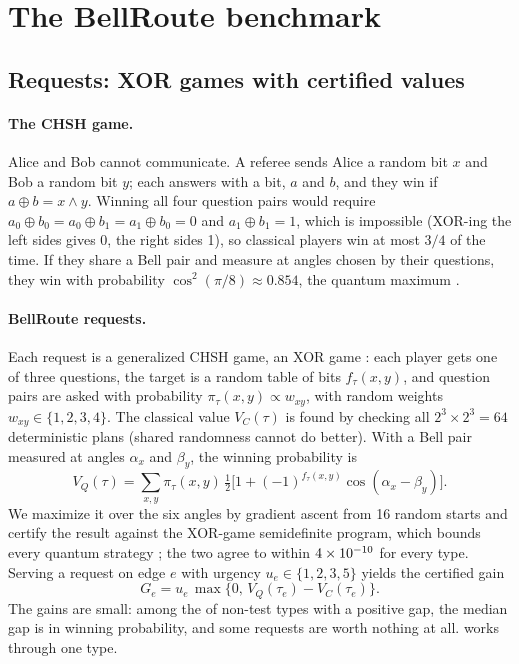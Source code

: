 \documentclass[10pt]{article}
\newcommand{\xor}{\mathbin{\oplus}}
\begin{document}
\section{The BellRoute benchmark}\label{sec:benchmark}

\subsection{Requests: XOR games with certified values}\label{sec:requests}

\paragraph{The CHSH game.} Alice and Bob cannot communicate. A referee sends Alice a random bit $x$ and Bob a random bit $y$; each answers with a bit, $a$ and $b$, and they win if $a\xor b=x\wedge y$. Winning all four question pairs would require $a_0\xor b_0=a_0\xor b_1=a_1\xor b_0=0$ and $a_1\xor b_1=1$, which is impossible (XOR-ing the left sides gives 0, the right sides 1), so classical players win at most $3/4$ of the time. If they share a Bell pair and measure at angles chosen by their questions, they win with probability $\cos^2(\pi/8)\approx0.854$, the quantum maximum \citep{tsirelson1980quantum}.

\paragraph{BellRoute requests.} Each request is a generalized CHSH game, an XOR game \citep{cleve2004consequences}: each player gets one of three questions, the target is a random table of bits $f_\tau(x,y)$, and question pairs are asked with probability $\pi_\tau(x,y)\propto w_{xy}$, with random weights $w_{xy}\in\{1,2,3,4\}$. The classical value $V_C(\tau)$ is found by checking all $2^3\times2^3=64$ deterministic plans (shared randomness cannot do better). With a Bell pair measured at angles $\alpha_x$ and $\beta_y$, the winning probability is
\begin{equation}
  V_Q(\tau)=\textstyle\sum_{x,y}\pi_\tau(x,y)\,\tfrac12\bigl[1+(-1)^{f_\tau(x,y)}\cos(\alpha_x-\beta_y)\bigr].
\end{equation}
We maximize it over the six angles by gradient ascent from 16 random starts and certify the result against the XOR-game semidefinite program, which bounds every quantum strategy \citep{tsirelson1980quantum,cleve2004consequences}; the two agree to within $4\times 10^{-10}$ for every type. Serving a request on edge $e$ with urgency $u_e\in\{1,2,3,5\}$ yields the certified gain
\begin{equation}
  G_e=u_e\,\max\{0,\,V_Q(\tau_e)-V_C(\tau_e)\}.
\end{equation}
The gains are small: among the \nonTestPositive{} of \nonTestTypes{} non-test types with a positive gap, the median gap is \gapMedian{} in winning probability, and some requests are worth nothing at all.  works through one type.
\end{document}
